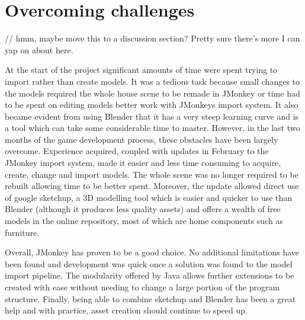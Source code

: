 \section{Overcoming challenges}

// hmm, maybe move this to a discussion section? Pretty sure there's more I can yap on about here. 

At the start of the project significant amounts of time were spent trying to import rather than create models. It was a tedious task because small changes to the models required the whole house scene to be remade in JMonkey or
time had to be spent on editing models better work with JMonkeys import system. It also became evident from using Blender that it has a very steep learning curve and is a tool which can take some considerable time to master.
However, in the last two months of the game development process, these obstacles have been largely overcome. Experience acquired, coupled with updates in February to the JMonkey import system, made it easier and less
time consuming to acquire, create, change and import models. The whole scene was no longer required to be rebuilt allowing time to be better spent. Moreover, the update allowed direct use of google sketchup, a 3D modelling
tool which is easier and quicker to use than Blender (although it produces less quality assets) and offers a wealth of free models in the online repository, most of which are home components such as furniture.

Overall, JMonkey has proven to be a good choice. No additional limitations have been found and development was quick once a solution was found to the model import pipeline. The modularity offered by Java allows
further extensions to be created with ease without needing to change a large portion of the program structure. Finally, being able to combine sketchup and Blender has been a great help and with practice, asset creation should
continue to speed up.